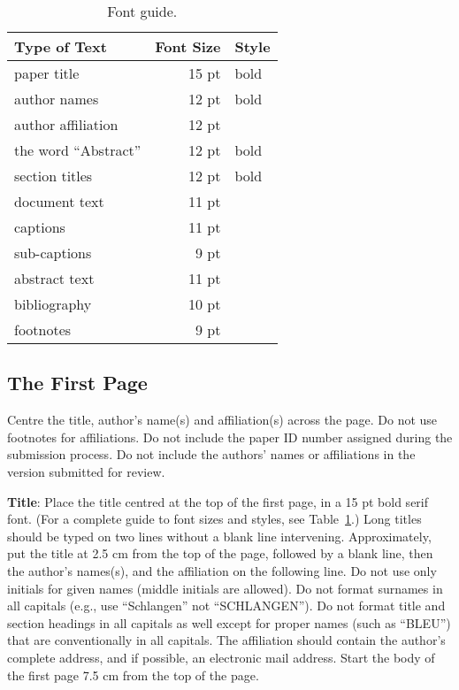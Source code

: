 \documentclass[11pt]{article}
\begin{document}
\begin{table}[h]
\begin{center}
\begin{tabular}{|l|rl|}
\hline \bf Type of Text & \bf Font Size & \bf Style \\ \hline
paper title & 15 pt & bold \\
author names & 12 pt & bold \\
author affiliation & 12 pt & \\
the word ``Abstract'' & 12 pt & bold \\
section titles & 12 pt & bold \\
document text & 11 pt  &\\
captions & 11 pt & \\
sub-captions & 9 pt & \\
abstract text & 11 pt & \\
bibliography & 10 pt & \\
footnotes & 9 pt & \\
\hline
\end{tabular}
\end{center}
\caption{\label{font-table} Font guide. }
\end{table}


\subsection{The First Page}
\label{ssec:first}

Centre the title, author's name(s) and affiliation(s) across
the page. Do not use footnotes for affiliations. Do not include the paper ID number assigned during the submission process. Do not include the authors' names or affiliations in the version submitted for review.

{\bf Title}: Place the title centred at the top of the first page, in a 15 pt bold serif font. (For a complete guide to font sizes and styles, see Table~\ref{font-table}.) Long titles should be typed on two lines without a blank line intervening. Approximately, put the title at 2.5 cm from the top of the page, followed by a blank line, then the author's names(s), and the affiliation on the following line. Do not use only initials for given names (middle initials are allowed). Do not format surnames in all capitals (e.g., use ``Schlangen'' not ``SCHLANGEN''). Do not format title and section headings in all
capitals as well except for proper names (such as ``BLEU'') that are conventionally in all capitals. The affiliation should contain the author's complete address, and if possible, an electronic mail address. Start the body of the first page 7.5 cm from the top of the page.
\end{document}

